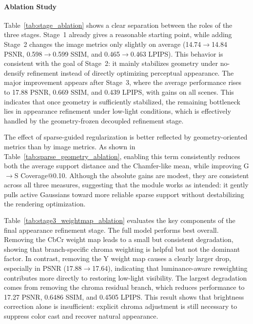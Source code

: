 \paragraph*{Ablation Study}
Table~\ref{tab:stage_ablation} shows a clear separation between the roles of
the three stages. Stage~1 already gives a reasonable starting point, while
adding Stage~2 changes the image metrics only slightly on average
(14.74$\rightarrow$14.84 PSNR, 0.598$\rightarrow$0.599 SSIM, and
0.465$\rightarrow$0.463 LPIPS). This behavior is consistent with the goal of
Stage~2: it mainly stabilizes geometry under no-densify refinement instead of
directly optimizing perceptual appearance. The major improvement appears after
Stage~3, where the average performance rises to 17.88 PSNR, 0.669 SSIM, and
0.439 LPIPS, with gains on all scenes. This indicates that once geometry is
sufficiently stabilized, the remaining bottleneck lies in appearance refinement
under low-light conditions, which is effectively handled by the geometry-frozen
decoupled refinement stage.



The effect of sparse-guided regularization is better reflected by
geometry-oriented metrics than by image metrics. As shown in
Table~\ref{tab:sparse_geometry_ablation}, enabling this term consistently
reduces both the average support distance and the Chamfer-like mean, while
improving G$\rightarrow$S Coverage@0.10. Although the absolute gains are
modest, they are consistent across all three measures, suggesting that the
module works as intended: it gently pulls active Gaussians toward more
reliable sparse support without destabilizing the rendering optimization.



Table~\ref{tab:stage3_weightmap_ablation} evaluates the key components of the
final appearance refinement stage. The full model performs best overall.
Removing the CbCr weight map leads to a small but consistent degradation,
showing that branch-specific chroma weighting is helpful but not the dominant
factor. In contrast, removing the Y weight map causes a clearly larger drop,
especially in PSNR (17.88$\rightarrow$17.64), indicating that luminance-aware
reweighting contributes more directly to restoring low-light visibility. The
largest degradation comes from removing the chroma residual branch, which
reduces performance to 17.27 PSNR, 0.6486 SSIM, and 0.4505 LPIPS. This result
shows that brightness correction alone is insufficient: explicit chroma
adjustment is still necessary to suppress color cast and recover natural
appearance.

